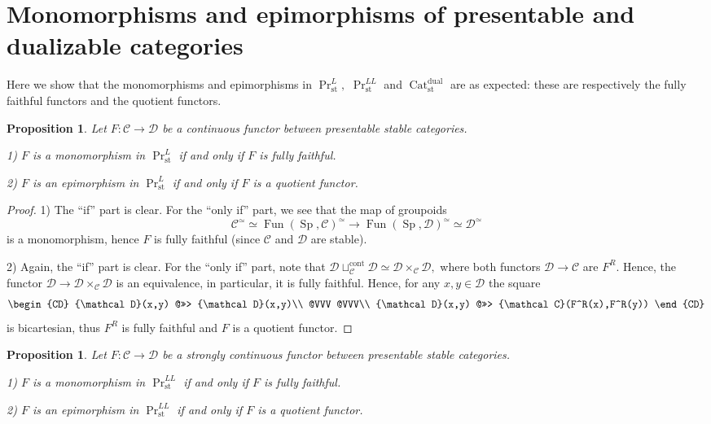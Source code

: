 \documentclass[11pt,leqno]{amsart}
\newtheorem{prop}[theo]{Proposition}
\numberwithin{equation}{section}
\newcommand{\Cat}{\operatorname{Cat}}
\newcommand{\cont}{\operatorname{cont}}
\newcommand{\st}{\operatorname{st}}
\newcommand{\dual}{\operatorname{dual}}
\newcommand{\cD}{{\mathcal D}}
\newcommand{\cC}{{\mathcal C}}
\newcommand{\Fun}{\operatorname{Fun}}
\newcommand{\Sp}{\operatorname{Sp}}
\begin{document}
\appendix



\section{Monomorphisms and epimorphisms of presentable and dualizable categories}
\label{app:mono_epi_pres_dual}

Here we show that the monomorphisms and epimorphisms in $\Pr^L_{\st},$ $\Pr^{LL}_{\st}$ and $\Cat_{\st}^{\dual}$ are as expected: these are respectively the fully faithful functors and the quotient functors.

\begin{prop}\label{prop:mono_epi_Pr^L} Let $F:\cC\to\cD$ be a continuous functor between presentable stable categories. 

1) $F$ is a monomorphism in $\Pr^L_{\st}$ if and only if $F$ is fully faithful. 

2) $F$ is an epimorphism in $\Pr^L_{\st}$ if and only if $F$ is a quotient functor.\end{prop}

\begin{proof} 1) The ``if'' part is clear. For the ``only if'' part, we see that the map of groupoids
$$\cC^{\simeq}\simeq \Fun(\Sp,\cC)^{\simeq}\to \Fun(\Sp,\cD)^{\simeq}\simeq\cD^{\simeq}$$ is a monomorphism, hence $F$ is fully faithful (since $\cC$ and $\cD$ are stable).

2) Again, the ``if'' part is clear. For the ``only if'' part, note that $\cD\sqcup_{\cC}^{\cont}\cD\simeq\cD\times_{\cC}\cD,$ where both functors $\cD\to\cC$ are $F^R.$ Hence, the functor $\cD\to\cD\times_{\cC}\cD$ is an equivalence, in particular, it is fully faithful. Hence, for any $x,y\in\cD$ the square
$$
\begin{CD}
\cD(x,y) @>>> \cD(x,y)\\
@VVV @VVV\\
\cD(x,y) @>>> \cC(F^R(x),F^R(y))
\end{CD}
$$
is bicartesian, thus $F^R$ is fully faithful and $F$ is a quotient functor.\end{proof}

\begin{prop}\label{prop:mono_epi_Pr^LL}Let $F:\cC\to\cD$ be a strongly continuous functor between presentable stable categories.

1) $F$ is a monomorphism in $\Pr^{LL}_{\st}$ if and only if $F$ is fully faithful. 

2) $F$ is an epimorphism in $\Pr^{LL}_{\st}$ if and only if $F$ is a quotient functor.
\end{prop}
\end{document}
